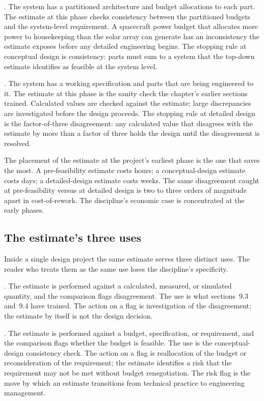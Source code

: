 . The system has a partitioned
architecture and budget allocations to each part. The estimate at
this phase checks consistency between the partitioned budgets and
the system-level requirement. A spacecraft power budget that
allocates more power to housekeeping than the solar array can
generate has an inconsistency the estimate exposes before any
detailed engineering begins. The stopping rule at conceptual
design is consistency: parts must sum to a system that the
top-down estimate identifies as feasible at the system level.

. The system has a working specification
and parts that are being engineered to it. The estimate at this
phase is the sanity check the chapter's earlier sections trained.
Calculated values are checked against the estimate; large
discrepancies are investigated before the design proceeds. The
stopping rule at detailed design is the factor-of-three
disagreement: any calculated value that disagrees with the
estimate by more than a factor of three holds the design until
the disagreement is resolved.

The placement of the estimate at the project's earliest phase is
the one that saves the most. A pre-feasibility estimate costs
hours; a conceptual-design estimate costs days; a detailed-design
estimate costs weeks. The same disagreement caught at
pre-feasibility versus at detailed design is two to three orders
of magnitude apart in cost-of-rework. The discipline's economic
case is concentrated at the early phases.

\subsection{The estimate's three uses}

Inside a single design project the same estimate serves three
distinct uses. The reader who treats them as the same use loses
the discipline's specificity.

. The estimate is performed against a
calculated, measured, or simulated quantity, and the comparison
flags disagreement. The use is what sections~9.3 and~9.4 have
trained. The action on a flag is investigation of the
disagreement; the estimate by itself is not the design decision.

. The estimate is performed against a budget,
specification, or requirement, and the comparison flags whether
the budget is feasible. The use is the conceptual-design
consistency check. The action on a flag is reallocation of the
budget or reconsideration of the requirement; the estimate
identifies a risk that the requirement may not be met without
budget renegotiation. The risk flag is the move by which an
estimate transitions from technical practice to engineering
management.


